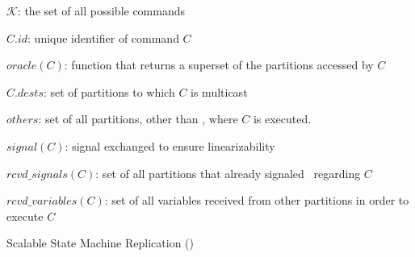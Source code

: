 \begin{algorithm}[t!]
\begin{distribalgo}[1]
$\mathcal{K}$: the set of all possible commands

\vspace{1mm}

$C.id$: unique identifier of command $C$

\vspace{1mm}

$oracle(C)$: function that returns a superset of the partitions accessed by $C$

\vspace{1mm}

$C.dests$: set of partitions to which $C$ is multicast

\vspace{1mm}

$others$: set of all partitions, other than \pp{}, where $C$ is executed.

\vspace{1mm}

$signal(C)$: signal exchanged to ensure linearizability

\vspace{1mm}

$rcvd\_signals(C)$: set of all partitions that already signaled \pp\ regarding $C$

\vspace{1mm}

$rcvd\_variables(C)$: set of all variables received from other partitions in order to execute $C$

\caption{Scalable State Machine Replication (\ssmr)}
\label{alg:ssmr}
\end{distribalgo}
\end{algorithm}